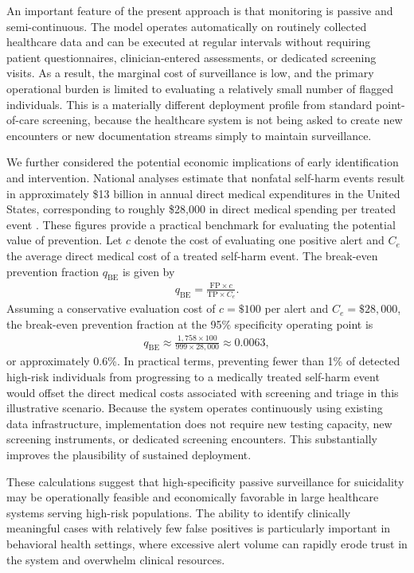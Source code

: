 \documentclass[onecolumn, compsoc,11pt]{IEEEtran}
\def\EQSP{3pt}
\newcommand{\cgather}[2][\EQSP]{\begingroup\setlength\abovedisplayskip{#1}\setlength\belowdisplayskip{#1}\begin{gather} #2 \end{gather}\endgroup\noindent}
\begin{document}
An important feature of the present approach is that monitoring is passive and semi-continuous. The model operates automatically on routinely collected healthcare data and can be executed at regular intervals without requiring patient questionnaires, clinician-entered assessments, or dedicated screening visits. As a result, the marginal cost of surveillance is low, and the primary operational burden is limited to evaluating a relatively small number of flagged individuals. This is a materially different deployment profile from standard point-of-care screening, because the healthcare system is not being asked to create new encounters or new documentation streams simply to maintain surveillance.

We further considered the potential economic implications of early identification and intervention. National analyses estimate that nonfatal self-harm events result in approximately \$13 billion in annual direct medical expenditures in the United States, corresponding to roughly \$28{,}000 in direct medical spending per treated event \cite{Peterson_2024_SelfHarmCosts}. These figures provide a practical benchmark for evaluating the potential value of prevention. Let $c$ denote the cost of evaluating one positive alert and $C_e$ the average direct medical cost of a treated self-harm event. The break-even prevention fraction $q_{\mathrm{BE}}$ is given by
\cgather{
q_{\mathrm{BE}} = \frac{\mathrm{FP} \times c}{\mathrm{TP} \times C_e}.
}
Assuming a conservative evaluation cost of $c = \$100$ per alert and $C_e = \$28{,}000$, the break-even prevention fraction at the 95\% specificity operating point is
\cgather{
q_{\mathrm{BE}} \approx \frac{1{,}758 \times 100}{999 \times 28{,}000} \approx 0.0063,
}
or approximately 0.6\%. In practical terms, preventing fewer than 1\% of detected high-risk individuals from progressing to a medically treated self-harm event would offset the direct medical costs associated with screening and triage in this illustrative scenario. Because the system operates continuously using existing data infrastructure, implementation does not require new testing capacity, new screening instruments, or dedicated screening encounters. This substantially improves the plausibility of sustained deployment.

These calculations suggest that high-specificity passive surveillance for suicidality may be operationally feasible and economically favorable in large healthcare systems serving high-risk populations. The ability to identify clinically meaningful cases with relatively few false positives is particularly important in behavioral health settings, where excessive alert volume can rapidly erode trust in the system and overwhelm clinical resources.
\end{document}
